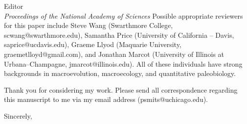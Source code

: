 \documentclass{letter}
\begin{document}
\begin{letter}{Editor \\ \textit{Proceedings of the National Academy of Sciences}}
  Possible appropriate reviewers for this paper include Steve Wang (Swarthmore College, scwang@swarthmore.edu), Samantha Price (University of California -- Davis, saprice@ucdavis.edu), Graeme Llyod (Maquarie University, graemetlloyd@gmail.com), and Jonathan Marcot (University of Illinois at Urbana--Champagne, jmarcot@illinois.edu). All of these individuals have strong backgrounds in macroevolution, macroecology, and quantitative paleobiology. 

  Thank you for considering my work. Please send all correspondence regarding this manuscript to me via my email address (psmits@uchicago.edu).

  \closing{Sincerely,}

\end{letter}
\end{document}
